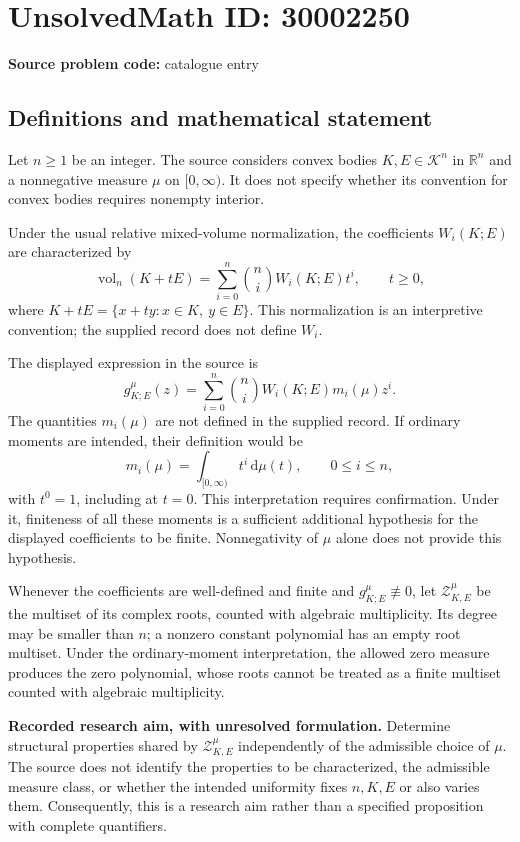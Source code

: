 \documentclass[11pt]{article}
\newcommand{\R}{\mathbb{R}}
\begin{document}
\section*{UnsolvedMath ID: 30002250}
\textbf{Source problem code:} catalogue entry
\subsection{Definitions and mathematical statement}
Let \(n\geq 1\) be an integer. The source considers convex bodies \(K,E\in\mathcal K^n\) in \(\R^n\) and a nonnegative measure \(\mu\) on \([0,\infty)\). It does not specify whether its convention for convex bodies requires nonempty interior.

Under the usual relative mixed-volume normalization, the coefficients \(W_i(K;E)\) are characterized by
\[
\operatorname{vol}_n(K+tE)=\sum_{i=0}^{n}\binom{n}{i}W_i(K;E)t^i,\qquad t\geq0,
\]
where \(K+tE=\{x+ty:x\in K,\ y\in E\}\). This normalization is an interpretive convention; the supplied record does not define \(W_i\).

The displayed expression in the source is
\[
g_{K;E}^{\mu}(z)=\sum_{i=0}^{n}\binom{n}{i}W_i(K;E)m_i(\mu)z^i.
\]
The quantities \(m_i(\mu)\) are not defined in the supplied record. If ordinary moments are intended, their definition would be
\[
m_i(\mu)=\int_{[0,\infty)}t^i\,\mathrm d\mu(t),\qquad 0\leq i\leq n,
\]
with \(t^0=1\), including at \(t=0\). This interpretation requires confirmation. Under it, finiteness of all these moments is a sufficient additional hypothesis for the displayed coefficients to be finite. Nonnegativity of \(\mu\) alone does not provide this hypothesis.

Whenever the coefficients are well-defined and finite and \(g_{K;E}^{\mu}\not\equiv0\), let \(\mathcal Z_{K,E}^{\mu}\) be the multiset of its complex roots, counted with algebraic multiplicity. Its degree may be smaller than \(n\); a nonzero constant polynomial has an empty root multiset. Under the ordinary-moment interpretation, the allowed zero measure produces the zero polynomial, whose roots cannot be treated as a finite multiset counted with algebraic multiplicity.

\textbf{Recorded research aim, with unresolved formulation.} Determine structural properties shared by \(\mathcal Z_{K,E}^{\mu}\) independently of the admissible choice of \(\mu\). The source does not identify the properties to be characterized, the admissible measure class, or whether the intended uniformity fixes \(n,K,E\) or also varies them. Consequently, this is a research aim rather than a specified proposition with complete quantifiers.
\end{document}
